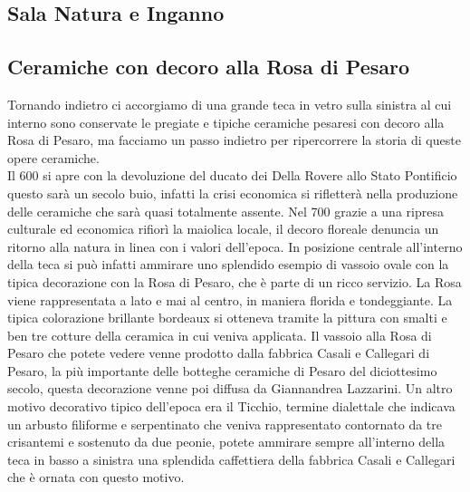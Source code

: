 \documentclass[hidelinks,12pt,a4paper]{article}
\begin{document}
\begin{flushleft}
			\section{Sala Natura e Inganno}
	
			\subsection{Ceramiche con decoro alla Rosa di Pesaro}
			Tornando indietro ci accorgiamo di una grande teca in vetro sulla sinistra al cui interno sono conservate le pregiate e tipiche ceramiche pesaresi con decoro alla Rosa di Pesaro, ma facciamo un passo indietro per ripercorrere la storia di queste opere ceramiche.\\
			Il 600 si apre con la devoluzione del ducato dei Della Rovere allo Stato Pontificio questo sarà un secolo buio, infatti la crisi economica si rifletterà nella produzione delle ceramiche che sarà quasi totalmente assente. Nel 700 grazie a una ripresa culturale ed economica rifiorì la maiolica locale, il decoro floreale denuncia un ritorno alla natura in linea con i valori dell'epoca. In posizione centrale all'interno della teca si può infatti ammirare uno splendido esempio di vassoio ovale con la tipica decorazione con la Rosa di Pesaro, che è parte di un ricco servizio. La Rosa viene rappresentata a lato e mai al centro, in maniera florida e tondeggiante. La tipica colorazione brillante bordeaux si otteneva tramite la pittura con smalti e ben tre cotture della ceramica in cui veniva applicata. Il vassoio alla Rosa di Pesaro che potete vedere venne prodotto dalla fabbrica Casali e Callegari di Pesaro, la più importante delle botteghe ceramiche di Pesaro del diciottesimo secolo, questa decorazione venne poi diffusa da Giannandrea Lazzarini. Un altro motivo decorativo tipico dell'epoca era il Ticchio, termine dialettale che indicava un arbusto filiforme e serpentinato che veniva rappresentato contornato da tre crisantemi e sostenuto da due peonie, potete ammirare sempre all'interno della teca in basso a sinistra una splendida caffettiera della fabbrica Casali e Callegari che è ornata con questo motivo.
	

\end{flushleft}
\end{document}
